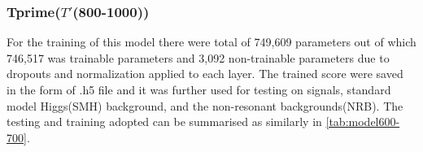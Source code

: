 \subsubsection{Tprime($T'$(800-1000))}

For the training of this model there were total of 749,609 parameters out of which 746,517 was trainable parameters and 3,092 non-trainable parameters due to dropouts and normalization applied to each layer. The trained score were saved in the form of .h5 file and it was further used for testing on signals, standard model Higgs(SMH) background, and the non-resonant backgrounds(NRB). The testing and training adopted can be summarised as similarly in \autoref{tab:model600-700}.





    
